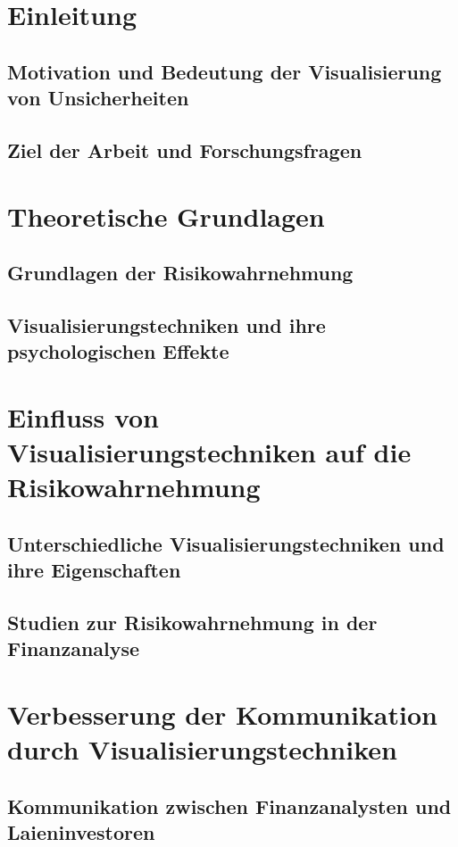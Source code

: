 \section{Einleitung}
\subsection{Motivation und Bedeutung der Visualisierung von Unsicherheiten}
\cite{Padilla2021}
\subsection{Ziel der Arbeit und Forschungsfragen}

\section{Theoretische Grundlagen}
\subsection{Grundlagen der Risikowahrnehmung}
\cite{Larcher2020}
\subsection{Visualisierungstechniken und ihre psychologischen Effekte}
\cite{Joslyn2021}

\section{Einfluss von Visualisierungstechniken auf die Risikowahrnehmung}
\subsection{Unterschiedliche Visualisierungstechniken und ihre Eigenschaften}
\cite{Pang1997}
\cite{Kerr2023}
\cite{Brodlie2012ARO}
\cite{Haber1990}
\subsection{Studien zur Risikowahrnehmung in der Finanzanalyse}

\section{Verbesserung der Kommunikation durch Visualisierungstechniken}
\subsection{Kommunikation zwischen Finanzanalysten und Laieninvestoren}
\cite{Joslyn2021}
